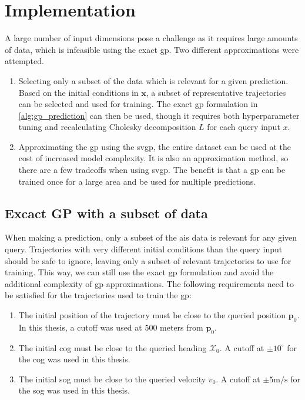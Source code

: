 \section{Implementation}
A large number of input dimensions pose a challenge as it requires large amounts of data, which is infeasible using the exact \acrshort{gp}. Two different approximations were attempted.

\begin{enumerate}
    \item Selecting only a subset of the data which is relevant for a given prediction. Based on the initial conditions in $\boldsymbol{x}$, a subset of representative trajectories can be selected and used for training. The exact \acrshort{gp} formulation in \cref{alg:gp_prediction} can then be used, though it requires both hyperparameter tuning and recalculating Cholesky decomposition $L$ for each query input $x$.
    \item Approximating the \acrshort{gp} using the \acrshort{svgp}, the entire dataset can be used at the cost of increased model complexity. It is also an approximation method, so there are a few tradeoffs when using \acrshort{svgp}. The benefit is that a \acrshort{gp} can be trained once for a large area and be used for multiple predictions.
\end{enumerate}

\subsection{Excact GP with a subset of data}
When making a prediction, only a subset of the \acrshort{ais} data is relevant for any given query. Trajectories with very different initial conditions than the query input should be safe to ignore, leaving only a subset of relevant trajectories to use for training. This way, we can still use the exact \acrshort{gp} formulation and avoid the additional complexity of \acrshort{gp} approximations. The following requirements need to be satisfied for the trajectories used to train the \acrshort{gp}:
\begin{enumerate}
    \item The initial position of the trajectory must be close to the queried position $\boldsymbol{p}_0$. In this thesis, a cutoff was used at $500$ meters from $\boldsymbol{p}_0$.
    \item The initial \acrshort{cog} must be close to the queried heading $\mathcal{X}_0$. A cutoff at $\pm 10^\circ$ for the \acrshort{cog} was used in this thesis.
    \item The initial \acrshort{sog} must be close to the queried velocity $v_0$. A cutoff at $\pm 5 \text{m/s}$ for the \acrshort{sog} was used in this thesis.
\end{enumerate} 

